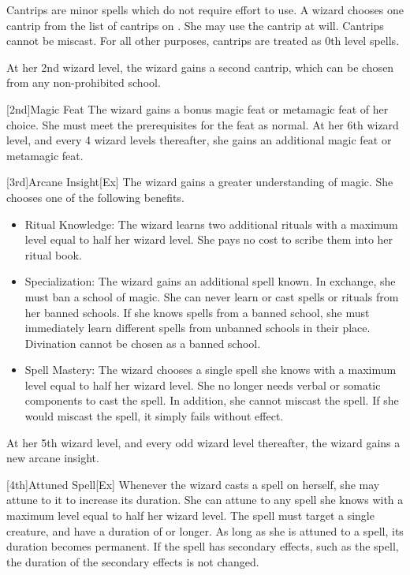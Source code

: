 Cantrips are minor spells which do not require effort to use.
A wizard chooses one cantrip from the list of cantrips on .
She may use the cantrip at will.
Cantrips cannot be miscast.
For all other purposes, cantrips are treated as 0th level spells.

At her 2nd wizard level, the wizard gains a second cantrip, which can be chosen from any non-prohibited school.

[2nd]{Magic Feat}
The wizard gains a bonus magic feat or metamagic feat of her choice.
She must meet the prerequisites for the feat as normal.
At her 6th wizard level, and every 4 wizard levels thereafter, she gains an additional magic feat or metamagic feat.

[3rd]{Arcane Insight}[Ex]\label{Arcane Insight}
The wizard gains a greater understanding of magic.
She chooses one of the following benefits.
\begin{itemize}
    \item Ritual Knowledge: The wizard learns two additional rituals with a maximum level equal to half her wizard level.
        She pays no cost to scribe them into her ritual book.
    \item Specialization: The wizard gains an additional spell known.
        In exchange, she must ban a school of magic.
        She can never learn or cast spells or rituals from her banned schools.
        If she knows spells from a banned school, she must immediately learn different spells from unbanned schools in their place.
        Divination cannot be chosen as a banned school.
    \item Spell Mastery: The wizard chooses a single spell she knows with a maximum level equal to half her wizard level.
        She no longer needs verbal or somatic components to cast the spell.
        In addition, she cannot miscast the spell.
        If she would miscast the spell, it simply fails without effect.
\end{itemize}

At her 5th wizard level, and every odd wizard level thereafter, the wizard gains a new arcane insight.

[4th]{Attuned Spell}[Ex]
Whenever the wizard casts a spell on herself, she may attune to it to increase its duration.
She can attune to any spell she knows with a maximum level equal to half her wizard level.
The spell must target a single creature, and have a duration of \durshort or longer.
As long as she is attuned to a spell, its duration becomes permanent.
If the spell has secondary effects, such as the  spell, the duration of the secondary effects is not changed.

